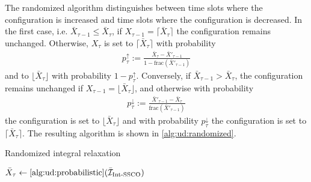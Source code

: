 The randomized algorithm distinguishes between time slots where the configuration is increased and time slots where the configuration is decreased. In the first case, i.e. $\bar{X}_{\tau-1} \leq \bar{X}_{\tau}$, if $X_{\tau-1} = \lceil\bar{X}_{\tau}\rceil$  the configuration remains unchanged. Otherwise, $X_{\tau}$ is set to $\lceil\bar{X}_{\tau}\rceil$ with probability \begin{align*}
    p_{\tau}^{\uparrow} := \frac{\bar{X}_{\tau} - \bar{X}'_{\tau-1}}{1 - \text{frac}(\bar{X}'_{\tau-1})}
\end{align*} and to $\lfloor\bar{X}_{\tau}\rfloor$ with probability $1 - p_{\tau}^{\uparrow}$. Conversely, if $\bar{X}_{\tau-1} > \bar{X}_{\tau}$, the configuration remains unchanged if $X_{\tau-1} = \lfloor\bar{X}_{\tau}\rfloor$, and otherwise with probability \begin{align*}
    p_{\tau}^{\downarrow} := \frac{\bar{X}'_{\tau-1} - \bar{X}_{\tau}}{\text{frac}(\bar{X}'_{\tau-1})}
\end{align*} the configuration is set to $\lfloor\bar{X}_{\tau}\rfloor$ and with probability $p_{\tau}^{\downarrow}$ the configuration is set to $\lceil\bar{X}_{\tau}\rceil$. The resulting algorithm is shown in \autoref{alg:ud:randomized}.

\begin{algorithm}
    \caption{Randomized integral relaxation \cite{Albers2018}}\label{alg:ud:randomized}
    $\bar{X}_{\tau} \gets \text{\autoref{alg:ud:probabilistic}}(\bar{\mathcal{I}}_{\text{Int-SSCO}})$\;
\end{algorithm}

